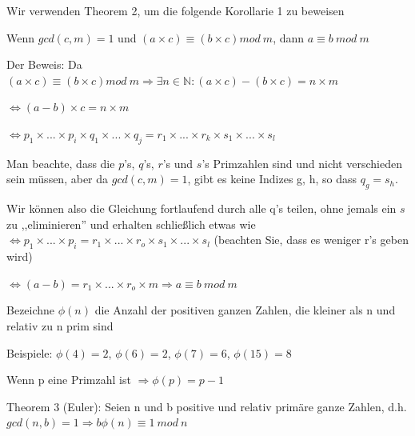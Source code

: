 \documentclass[a4paper]{article}
\begin{document}
\begin{multicols}{3}
\begin{itemize*}
\begin{itemize*}
\begin{itemize*}
                  \end{itemize*}
                  \item Wir verwenden Theorem 2, um die folgende Korollarie 1 zu beweisen
                  \begin{itemize*}
                        \item Wenn $gcd(c,m)=1$ und $(a\times c)\equiv(b\times c)mod\ m$, dann $a\equiv b\ mod\ m$
                        \item Der Beweis: Da $(a\times c)\equiv(b\times c)mod\ m\Rightarrow\exists n\in\mathbb{N}:(a\times c)-(b\times c)=n\times m$
                        \item $\Leftrightarrow ( a - b ) \times c = n \times m$
                        \item $\Leftrightarrow p_1\times ...\times p_i\times q_1\times ...\times q_j=r_1\times ...\times r_k\times s_1\times ...\times s_l$
                        \item Man beachte, dass die $p$'s, $q$'s, $r$'s und $s$'s Primzahlen sind und nicht verschieden sein müssen, aber da $gcd(c,m)=1$, gibt es keine Indizes g, h, so dass $q_g = s_h$.
                        \item Wir können also die Gleichung fortlaufend durch alle q's teilen, ohne jemals ein $s$ zu ,,eliminieren'' und erhalten schließlich etwas wie $\Leftrightarrow p_1\times ...\times p_i=r_1\times ...\times r_o\times s_1\times ...\times s_l$ (beachten Sie, dass es weniger r's geben wird)
                        \item $\Leftrightarrow(a-b)=r_1\times ...\times r_o\times m\Rightarrow a \equiv b\ mod\ m$
                  \end{itemize*}
                  \item Bezeichne $\phi(n)$ die Anzahl der positiven ganzen Zahlen, die kleiner als n und relativ zu n prim sind
                  \begin{itemize*}
                        \item Beispiele: $\phi(4) = 2$, $\phi(6)=2$, $\phi(7)=6$, $\phi(15)=8$
                        \item Wenn p eine Primzahl ist $\Rightarrow\phi(p)=p-1$
                  \end{itemize*}
            \end{itemize*}
            \item Theorem 3 (Euler): Seien n und b positive und relativ primäre ganze
            Zahlen, d.h. $gcd(n, b) = 1 \Rightarrow b \phi(n) \equiv 1\ mod\ n$

\end{itemize*}
\end{multicols}
\end{document}
